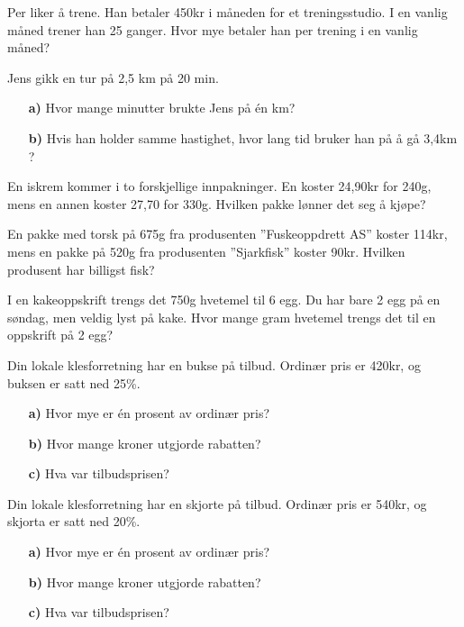 \documentclass[a4, 11pt, twoside]{article}
\theoremstyle{definition}
\begin{document}
\begin{Exercise}
Per liker å trene. Han betaler 450kr i måneden for et treningsstudio.
I en vanlig måned trener han 25 ganger. Hvor mye betaler han per
trening i en vanlig måned?
\end{Exercise}

\begin{Exercise}
Jens gikk en tur på 2,5 km på 20 min.
\begin{itemize}
\item[\bf a)] Hvor mange minutter brukte Jens på én km?
\item[\bf b)] Hvis han holder samme hastighet,
hvor lang tid bruker han på å gå 3,4km ?
\end{itemize}
\end{Exercise}

\begin{Exercise}
En iskrem kommer i to forskjellige innpakninger.
En koster 24,90kr for 240g, mens en annen koster 
27,70 for 330g. Hvilken pakke lønner det seg å kjøpe?
\end{Exercise}

\begin{Exercise}
En pakke med torsk på 675g fra produsenten ''Fuskeoppdrett AS''
koster 114kr, mens en pakke på 520g fra produsenten ''Sjarkfisk''
koster 90kr. Hvilken produsent har billigst fisk?
\end{Exercise}

\begin{Exercise}
  I en kakeoppskrift trengs det 750g hvetemel til 6 egg.
  Du har bare 2 egg på en søndag, men veldig lyst på kake.
  Hvor mange gram hvetemel trengs det til en oppskrift på 2 egg?
\end{Exercise}

\begin{Exercise}
Din lokale klesforretning har en bukse på tilbud. Ordinær pris er
420kr, og buksen er satt ned 25\%.
\begin{itemize}
\item[\bf a)] Hvor mye er én prosent av ordinær pris?
\item[\bf b)] Hvor mange kroner utgjorde rabatten?
\item[\bf c)] Hva var tilbudsprisen?
\end{itemize}
\end{Exercise}



\begin{Exercise}
Din lokale klesforretning har en skjorte på tilbud. Ordinær pris er
540kr, og skjorta er satt ned 20\%.
\begin{itemize}
\item[\bf a)] Hvor mye er én prosent av ordinær pris?
\item[\bf b)] Hvor mange kroner utgjorde rabatten?
\item[\bf c)] Hva var tilbudsprisen?
\end{itemize}
\end{Exercise}
\end{document}
